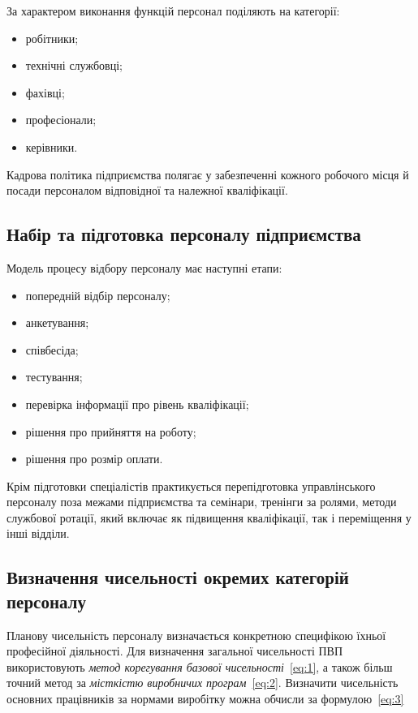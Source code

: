 \documentclass[a5paper,10pt,notitlepage,pdftex,headsepline]{scrartcl}
\begin{document}
    За характером виконання функцій персонал поділяють на категорії:
    \begin{itemize}
      \item робітники;
      \item технічні службовці;
      \item фахівці;
      \item професіонали;
      \item керівники.
    \end{itemize}

    Кадрова політика підприємства полягає у забезпеченні кожного робочого
    місця й посади персоналом відповідної та належної кваліфікації.
  \subsection{Набір та підготовка персоналу підприємства}
    Модель процесу відбору персоналу має наступні етапи:
    \begin{itemize}
      \item попередній відбір персоналу;
      \item анкетування;
      \item співбесіда;
      \item тестування;
      \item перевірка інформації про рівень кваліфікації;
      \item рішення про прийняття на роботу;
      \item рішення про розмір оплати.
    \end{itemize}

    Крім підготовки спеціалістів практикується перепідготовка управлінського
    персоналу поза межами підприємства та семінари, тренінги за ролями, методи
    службової ротації, який включає як підвищення кваліфікації, так і
    переміщення у інші відділи.
  \subsection{Визначення чисельності окремих категорій персоналу}
    Планову чисельність персоналу визначається конкретною специфікою їхньої
    професійної діяльності.
    Для визначення загальної чисельності ПВП використовують \emph{метод
    корегування базової чисельності}~\eqref{eq:1}, а також більш точний метод
    за \emph{місткістю виробничих програм}~\eqref{eq:2}.
    Визначити чисельність основних працівників за нормами виробітку можна
    обчисли за формулою~\eqref{eq:3}
\end{document}
